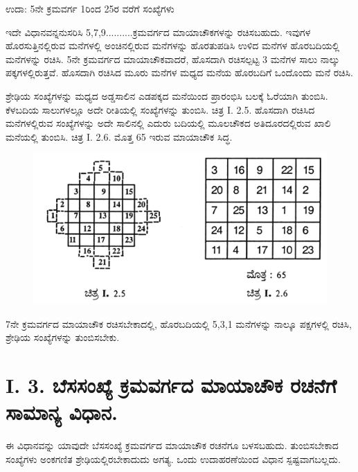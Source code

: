 ಉದಾ: 5ನೇ ಕ್ರಮವರ್ಗ 1ರಿಂದ 25ರ ವರೆಗೆ ಸಂಖ್ಯೆಗಳು

ಇದೇ ವಿಧಾನವನ್ನನುಸರಿಸಿ 5,7,9..........ಕ್ರಮವರ್ಗದ ಮಾಯಾಚೌಕಗಳನ್ನು ರಚಿಸಬಹುದು. ಇವುಗಳ ಹೊರಸುತ್ತಿನಲ್ಲಿರುವ ಮನೆಗಳಲ್ಲಿ ಅಂಚಿನಲ್ಲಿರುವ ಮನೆಗಳನ್ನು ಹೊರತುಪಡಿಸಿ ಉಳಿದ ಮನೆಗಳ ಹೊರಬದಿಯಲ್ಲಿ ಮನೆಗಳನ್ನು ರಚಿಸಿ. 5ನೇ ಕ್ರಮವರ್ಗದ ಮಾಯಾಚೌಕವಾದರೆ, ಹೊಸದಾಗಿ ರಚಿಸಲ್ಪಟ್ಟ 3 ಮನೆಗಳ ಸಾಲು ನಾಲ್ಕು ಪಕ್ಕಗಳಲ್ಲಿರುತ್ತವೆ. ಹೊಸ\-ದಾಗಿ ರಚಿಸಿದ ಮೂರು ಮನೆಗಳ ಮಧ್ಯದ ಮನೆಯ ಹೊರಬದಿಗೆ ಒಂದೊಂದು ಮನೆ ರಚಿಸಿ.

ಶ್ರೇಢಿಯ ಸಂಖ್ಯೆಗಳನ್ನು ಮಧ್ಯದ ಅಡ್ಡಸಾಲಿನ ಎಡಪಕ್ಕದ ಮನೆಯಿಂದ ಪ್ರಾರಂಭಿಸಿ ಬಲಕ್ಕೆ ಓರೆಯಾಗಿ ತುಂಬಿಸಿ. ಕೆಳಬದಿಯ ಸಾಲುಗಳಲ್ಲೂ ಅದೇ ರೀತಿಯಲ್ಲಿ ಸಂಖ್ಯೆಗಳನ್ನು ತುಂಬಿಸಿ. ಚಿತ್ರ I. 2.5. ಹೊಸದಾಗಿ ರಚಿಸಿದ ಮನೆಗಳಲ್ಲಿರುವ ಸಂಖ್ಯೆಗಳನ್ನು ಅದೇ ಸಾಲಿನಲ್ಲಿ ಎದುರು ಬದಿಯಲ್ಲಿ ಮೂಲಚೌಕದ ಅತಿದೂರದಲ್ಲಿರುವ ಖಾಲಿ ಮನೆಯಲ್ಲಿ ತುಂಬಿಸಿ. ಚಿತ್ರ I. 2.6. ಮೊತ್ತ 65 ಇರುವ ಮಾಯಾಚೌಕ ಸಿದ್ಧ.
\begin{figure}[h]
\includegraphics{src/figures/chap3/fig3-5.jpg}
\end{figure}

7ನೇ ಕ್ರಮವರ್ಗದ ಮಾಯಾಚೌಕ ರಚಿಸಬೇಕಾದಲ್ಲಿ, ಹೊರಬದಿಯಲ್ಲಿ 5,3,1 ಮನೆ\-ಗಳನ್ನು ನಾಲ್ಕೂ ಪಕ್ಷಗಳಲ್ಲಿ ರಚಿಸಿ, ಶ್ರೇಢಿಯ ಸಂಖ್ಯೆಗಳನ್ನು ತುಂಬಿಸಬೇಕು.

\newpage

\section*{I. 3. ಬೆಸಸಂಖ್ಯೆ  ಕ್ರಮವರ್ಗದ ಮಾಯಾಚೌಕ ರಚನೆಗೆ ಸಾಮಾನ್ಯ ವಿಧಾನ.}

ಈ ವಿಧಾನವನ್ನು ಯಾವುದೇ ಬೆಸಸಂಖ್ಯೆ ಕ್ರಮವರ್ಗದ ಮಾಯಾಚೌಕ ರಚನೆಗೂ ಬಳಸ\-ಬಹುದು. ತುಂಬಿಸಬೇಕಾದ ಸಂಖ್ಯೆಗಳು ಅಂಕಗಣಿತ ಶ್ರೇಢಿಯಲ್ಲಿರಬೇಕಾದುದು ಅಗತ್ಯ. ಒಂದು ಉದಾಹರಣೆಯಿಂದ ವಿಧಾನ ಸ್ಪಷ್ಟವಾಗಬಲ್ಲದು.

